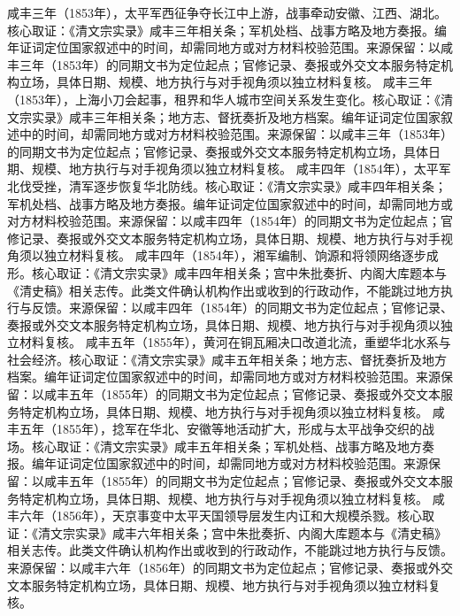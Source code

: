 咸丰三年（1853年），太平军西征争夺长江中上游，战事牵动安徽、江西、湖北。核心取证：《清文宗实录》咸丰三年相关条；军机处档、战事方略及地方奏报。编年证词定位国家叙述中的时间，却需同地方或对方材料校验范围。来源保留：以咸丰三年（1853年）的同期文书为定位起点；官修记录、奏报或外交文本服务特定机构立场，具体日期、规模、地方执行与对手视角须以独立材料复核。
咸丰三年（1853年），上海小刀会起事，租界和华人城市空间关系发生变化。核心取证：《清文宗实录》咸丰三年相关条；地方志、督抚奏折及地方档案。编年证词定位国家叙述中的时间，却需同地方或对方材料校验范围。来源保留：以咸丰三年（1853年）的同期文书为定位起点；官修记录、奏报或外交文本服务特定机构立场，具体日期、规模、地方执行与对手视角须以独立材料复核。
咸丰四年（1854年），太平军北伐受挫，清军逐步恢复华北防线。核心取证：《清文宗实录》咸丰四年相关条；军机处档、战事方略及地方奏报。编年证词定位国家叙述中的时间，却需同地方或对方材料校验范围。来源保留：以咸丰四年（1854年）的同期文书为定位起点；官修记录、奏报或外交文本服务特定机构立场，具体日期、规模、地方执行与对手视角须以独立材料复核。
咸丰四年（1854年），湘军编制、饷源和将领网络逐步成形。核心取证：《清文宗实录》咸丰四年相关条；宫中朱批奏折、内阁大库题本与《清史稿》相关志传。此类文件确认机构作出或收到的行政动作，不能跳过地方执行与反馈。来源保留：以咸丰四年（1854年）的同期文书为定位起点；官修记录、奏报或外交文本服务特定机构立场，具体日期、规模、地方执行与对手视角须以独立材料复核。
咸丰五年（1855年），黄河在铜瓦厢决口改道北流，重塑华北水系与社会经济。核心取证：《清文宗实录》咸丰五年相关条；地方志、督抚奏折及地方档案。编年证词定位国家叙述中的时间，却需同地方或对方材料校验范围。来源保留：以咸丰五年（1855年）的同期文书为定位起点；官修记录、奏报或外交文本服务特定机构立场，具体日期、规模、地方执行与对手视角须以独立材料复核。
咸丰五年（1855年），捻军在华北、安徽等地活动扩大，形成与太平战争交织的战场。核心取证：《清文宗实录》咸丰五年相关条；军机处档、战事方略及地方奏报。编年证词定位国家叙述中的时间，却需同地方或对方材料校验范围。来源保留：以咸丰五年（1855年）的同期文书为定位起点；官修记录、奏报或外交文本服务特定机构立场，具体日期、规模、地方执行与对手视角须以独立材料复核。
咸丰六年（1856年），天京事变中太平天国领导层发生内讧和大规模杀戮。核心取证：《清文宗实录》咸丰六年相关条；宫中朱批奏折、内阁大库题本与《清史稿》相关志传。此类文件确认机构作出或收到的行政动作，不能跳过地方执行与反馈。来源保留：以咸丰六年（1856年）的同期文书为定位起点；官修记录、奏报或外交文本服务特定机构立场，具体日期、规模、地方执行与对手视角须以独立材料复核。
